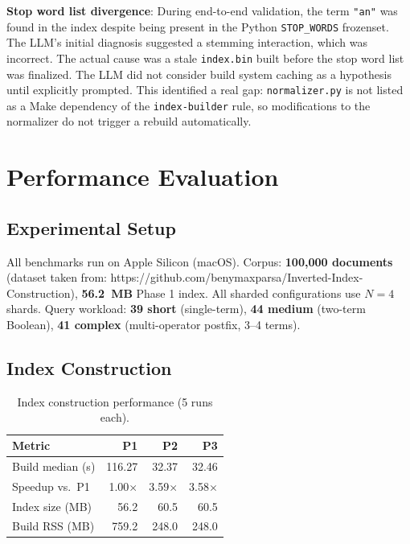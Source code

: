 \documentclass[twocolumn, 10pt]{article}
\begin{document}
\textbf{Stop word list divergence}: During end-to-end validation, the term
\texttt{"an"} was found in the index despite being present in the Python
\texttt{STOP\_WORDS} frozenset. The LLM's initial diagnosis suggested a
stemming interaction, which was incorrect. The actual cause was a stale
\texttt{index.bin} built before the stop word list was finalized. The LLM
did not consider build system caching as a hypothesis until explicitly
prompted. This identified a real gap: \texttt{normalizer.py} is not listed
as a Make dependency of the \texttt{index-builder} rule, so modifications
to the normalizer do not trigger a rebuild automatically.

\section{Performance Evaluation}

\subsection{Experimental Setup}

All benchmarks run on Apple Silicon (macOS). Corpus: \textbf{100,000
documents} (dataset taken from: https://github.com/benymaxparsa/Inverted-Index-Construction),
\textbf{56.2~MB} Phase 1 index. All sharded configurations use $N=4$ shards. Query workload:
\textbf{39 short} (single-term), \textbf{44 medium} (two-term Boolean),
\textbf{41 complex} (multi-operator postfix, 3--4 terms).

\subsection{Index Construction}

\begin{table}[H]
\centering
\caption{Index construction performance (5 runs each).}
\label{tab:build}
\begin{tabular}{lrrr}
\toprule
\textbf{Metric} & \textbf{P1} & \textbf{P2} & \textbf{P3} \\
\midrule
Build median (s)  & 116.27 & 32.37 & 32.46 \\
Speedup vs.\ P1   & 1.00$\times$ & 3.59$\times$ & 3.58$\times$ \\
Index size (MB)    & 56.2  & 60.5  & 60.5  \\
Build RSS (MB)     & 759.2 & 248.0 & 248.0 \\
\bottomrule
\end{tabular}
\end{table}
\end{document}
